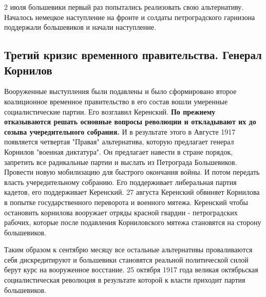 \documentclass[a4paper]{article}
\begin{document}
2 июля большевики первый раз попытались реализовать свою альтернативу. Началось немецкое наступление на фронте и солдаты петроградского гарнизона поддержали большевиков и начали наступление.

\subsection{Третий кризис временного правительства. Генерал Корнилов}
Вооруженные выступления были подавлены и было сформировано второе коалиционное временное правительство в его состав вошли умеренные социалистические партии. Его возглавил Керенский.
\textbf{По прежнему отказываются решать основные вопросы революции и откладывают их до созыва учередительного собрания.}
И в результате этого в Августе 1917 появляется четвертая "Правая" альтернатива, которую предлагает генерал Корнилов "военная диктатура". Он предлагает навести в стране порядок, запретить все радикальные партии и выслать из Петрограда Большевиков. Провести новую мобилизацию для быстрого окончания войны. И потом передать власть учередительному собранию. Его поддерживает либеральная партия кадетов, его поддерживает Керенский.
27 августа Керенский обвиняет Корнилова в попытке государственного переворота и военного мятежа. Керенский чтобы остановить корнилова вооружает отряды красной гвардии - петроградских рабочих, которые после подавления Корниловского мятежа становятся на сторону большевиков.

Таким образом к сентябрю месяцу все остальные альтернативы проваливаются себя дискредитируют и большевики становятся реальной политической силой
берут курс на вооруженное восстание.
25 октября 1917 года великая октябрьская социалистическая революция в результате которой к власти приходит партия большевиков.
\end{document}
